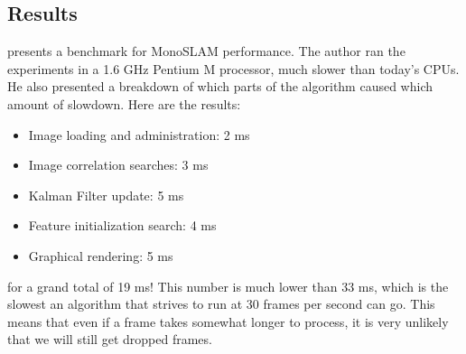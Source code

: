 \documentclass{article}
\begin{document}
\subsection{Results}

\cite{Davison2007} presents a benchmark for MonoSLAM performance. The author ran the experiments in a 1.6 GHz Pentium M processor, much slower than today's CPUs. He also presented a breakdown of which parts of the algorithm caused which amount of slowdown. Here are the results:

\begin{itemize}
\item Image loading and administration: 2 ms
\item Image correlation searches: 3 ms
\item Kalman Filter update: 5 ms
\item Feature initialization search: 4 ms
\item Graphical rendering: 5 ms
\end{itemize}

for a grand total of 19 ms! This number is much lower than 33 ms, which is the slowest an algorithm that strives to run at 30 frames per second can go. This means that even if a frame takes somewhat longer to process, it is very unlikely that we will still get dropped frames. \\

{}

\end{document}
